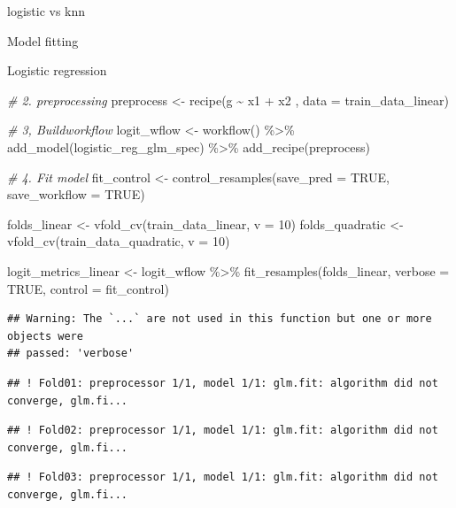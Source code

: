 \documentclass[
  ignorenonframetext,
]{article}
\newenvironment{Shaded}{\begin{snugshade}}{\end{snugshade}}
\newcommand{\AttributeTok}[1]{\textcolor[rgb]{0.77,0.63,0.00}{#1}}
\newcommand{\CommentTok}[1]{\textcolor[rgb]{0.56,0.35,0.01}{\textit{#1}}}
\newcommand{\ConstantTok}[1]{\textcolor[rgb]{0.00,0.00,0.00}{#1}}
\newcommand{\DecValTok}[1]{\textcolor[rgb]{0.00,0.00,0.81}{#1}}
\newcommand{\FunctionTok}[1]{\textcolor[rgb]{0.00,0.00,0.00}{#1}}
\newcommand{\NormalTok}[1]{#1}
\newcommand{\OtherTok}[1]{\textcolor[rgb]{0.56,0.35,0.01}{#1}}
\newcommand{\SpecialCharTok}[1]{\textcolor[rgb]{0.00,0.00,0.00}{#1}}
\begin{document}
\begin{frame}[fragile]{logistic vs knn}
\begin{block}{Model fitting}
\begin{block}{Logistic regression}
\begin{Shaded}
\begin{Highlighting}[]
\CommentTok{\# 2. preprocessing }
\NormalTok{preprocess }\OtherTok{\textless{}{-}} 
  \FunctionTok{recipe}\NormalTok{(g }\SpecialCharTok{\textasciitilde{}}\NormalTok{ x1 }\SpecialCharTok{+}\NormalTok{ x2 , }\AttributeTok{data =}\NormalTok{ train\_data\_linear)}
  
\CommentTok{\# 3, Buildworkflow}
\NormalTok{logit\_wflow }\OtherTok{\textless{}{-}} 
  \FunctionTok{workflow}\NormalTok{() }\SpecialCharTok{\%\textgreater{}\%} 
  \FunctionTok{add\_model}\NormalTok{(logistic\_reg\_glm\_spec) }\SpecialCharTok{\%\textgreater{}\%} 
  \FunctionTok{add\_recipe}\NormalTok{(preprocess)}

\CommentTok{\# 4. Fit model}
\NormalTok{fit\_control }\OtherTok{\textless{}{-}} \FunctionTok{control\_resamples}\NormalTok{(}\AttributeTok{save\_pred =} \ConstantTok{TRUE}\NormalTok{, }\AttributeTok{save\_workflow =} \ConstantTok{TRUE}\NormalTok{)}

\NormalTok{folds\_linear }\OtherTok{\textless{}{-}} \FunctionTok{vfold\_cv}\NormalTok{(train\_data\_linear, }\AttributeTok{v =} \DecValTok{10}\NormalTok{)}
\NormalTok{folds\_quadratic }\OtherTok{\textless{}{-}} \FunctionTok{vfold\_cv}\NormalTok{(train\_data\_quadratic, }\AttributeTok{v =} \DecValTok{10}\NormalTok{)}


\NormalTok{logit\_metrics\_linear }\OtherTok{\textless{}{-}} 
\NormalTok{  logit\_wflow }\SpecialCharTok{\%\textgreater{}\%} 
  \FunctionTok{fit\_resamples}\NormalTok{(folds\_linear, }\AttributeTok{verbose =} \ConstantTok{TRUE}\NormalTok{, }\AttributeTok{control =}\NormalTok{ fit\_control)}
\end{Highlighting}
\end{Shaded}

\begin{verbatim}
## Warning: The `...` are not used in this function but one or more objects were
## passed: 'verbose'
\end{verbatim}

\begin{verbatim}
## ! Fold01: preprocessor 1/1, model 1/1: glm.fit: algorithm did not converge, glm.fi...
\end{verbatim}

\begin{verbatim}
## ! Fold02: preprocessor 1/1, model 1/1: glm.fit: algorithm did not converge, glm.fi...
\end{verbatim}

\begin{verbatim}
## ! Fold03: preprocessor 1/1, model 1/1: glm.fit: algorithm did not converge, glm.fi...
\end{verbatim}


\end{block}
\end{block}
\end{frame}
\end{document}
